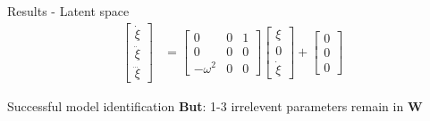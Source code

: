 \documentclass{beamer}
\begin{document}
\begin{frame}{Results - Latent space}
  \resizebox{!}{.28\linewidth}{}
  \resizebox{!}{.28\linewidth}{}
  \resizebox{!}{.28\linewidth}{}
  \color{black} %
  \begin{align*}
    \begin{bmatrix}
      \dot{\xi} \\ \ddot{\xi} \\ \dddot{\xi}
    \end{bmatrix}
    &=
    \begin{bmatrix}
      0 & 0 & 1\\
      0 & 0 & 0\\
      -\omega^2 & 0 & 0
    \end{bmatrix}
    \begin{bmatrix}
      \xi \\ 0 \\ \dot{\xi}
    \end{bmatrix}
    +
    \begin{bmatrix}
      0 \\ 0 \\ 0
    \end{bmatrix}
  \end{align*}

  \begin{block}{Successful model identification}
    \textbf{But}: 1-3 irrelevent parameters remain in $\bm W$
  \end{block}
\end{frame}
\end{document}

